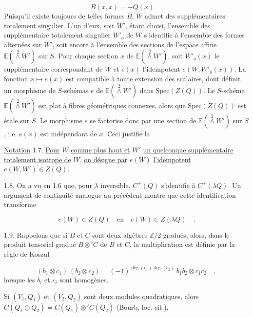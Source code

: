 \begin{equation*}
B(x,x) = - Q(x) \quad .
\end{equation*}
Puisqu'il existe toujours de telles formes $B$, $W$ admet des supplémentaires totalement singulier. L'un d'eux, soit $W'$, étant choisi, l'ensemble des supplémentaire totalement singulier $W'_o$ de $W$ s'identifie à l'ensemble des formes alternées sur $W'$, soit encore à l'ensemble des sections de l'espace affine $\mathbb{E}(\overset{2}{\wedge} W')$ sur $S$. Pour chaque section $x$ de $\mathbb{E}(\overset{2}{\wedge} W')$, soit $W'_o(x)$ le supplémentaire correspondant de $W$ et $e(x)$ l'idempotent $e(W, W'_o(x))$. La fonction $x \longmapsto e(x)$ est compatible à toute extension des scalaires, dont définit un morphisme de $S$-schémas $e$ de $\mathbb{E}(\overset{2}{\wedge} W')$ dans $\mathrm{Spec}(Z(Q))$. Le $S$-schéma $\mathbb{E}(\overset{2}{\wedge} W')$ est plat à fibres géométriques connexes, alors que $\mathrm{Spec}(Z(Q))$ est étale sur $S$. Le morphisme $e$ se factorise donc par une section de $\mathbb{E}(\overset{2}{\wedge} W')$ sur $S$, i.e. $e(x)$ est indépendant de $x$. Ceci justifie la

\underline{Notation} 1.7. \underline{Pour} $W$ \underline{comme plus haut et} $W'$ \underline{un quelconque supplémentaire totalement isotrope de} $W$, \underline{on désigne par} $e(W)$ \underline{l'idempotent} $e(W,W') \in Z(Q)$.

1.8. On a vu en 1.6 que, pour $\lambda$ inversible, $C^+(Q)$ s'identifie à $C^+(\lambda Q)$. Un argument de continuité analogue au précédent montre que cette identification transforme

\begin{equation*}
e(W) \in Z(Q) \quad \mbox{en} \quad e(W) \in Z(\lambda Q) \quad .
\end{equation*}


1.9. Rappelons que si $B$ et $C$ sont deux algèbres $\mathbb{Z}/2$-gradués, alors, dans le produit tensoriel gradué $B \otimes' C$ de $B$ et $C$, la multiplication est définie par la règle de Koszul

\begin{equation*}
(b_1 \otimes c_1)\ (b_2 \otimes c_2) = (-1)^{\deg(c_1)\deg(b_2)}\ b_1 b_2 \otimes c_1 c_2 \quad ,
\end{equation*}
lorsque les $b_i$ et $c_i$ sont homogènes.

Si $(V_1, Q_1)$ et $(V_2, Q_2)$ sont deux modules quadratiques, alors $C(Q_1 \oplus Q_2) = C(Q_1) \otimes' C(Q_2)$ (Bourb. loc. cit.).

